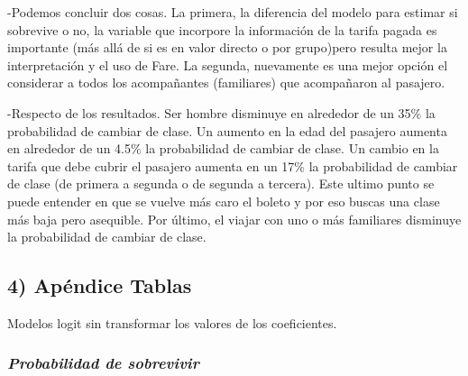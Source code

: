 \documentclass[
]{article}
\begin{document}
-Podemos concluir dos cosas. La primera, la diferencia del modelo para
estimar si sobrevive o no, la variable que incorpore la información de
la tarifa pagada es importante (más allá de si es en valor directo o por
grupo)pero resulta mejor la interpretación y el uso de Fare. La segunda,
nuevamente es una mejor opción el considerar a todos los acompañantes
(familiares) que acompañaron al pasajero.

-Respecto de los resultados. Ser hombre disminuye en alrededor de un
35\% la probabilidad de cambiar de clase. Un aumento en la edad del
pasajero aumenta en alrededor de un 4.5\% la probabilidad de cambiar de
clase. Un cambio en la tarifa que debe cubrir el pasajero aumenta en un
17\% la probabilidad de cambiar de clase (de primera a segunda o de
segunda a tercera). Este ultimo punto se puede entender en que se vuelve
más caro el boleto y por eso buscas una clase más baja pero asequible.
Por último, el viajar con uno o más familiares disminuye la probabilidad
de cambiar de clase.

\hypertarget{apuxe9ndice-tablas}{%
\subsection{4) Apéndice Tablas}\label{apuxe9ndice-tablas}}

Modelos logit sin transformar los valores de los coeficientes.

\hypertarget{probabilidad-de-sobrevivir}{%
\subsubsection{\texorpdfstring{\emph{Probabilidad de
sobrevivir}}{Probabilidad de sobrevivir}}\label{probabilidad-de-sobrevivir}}
\end{document}
